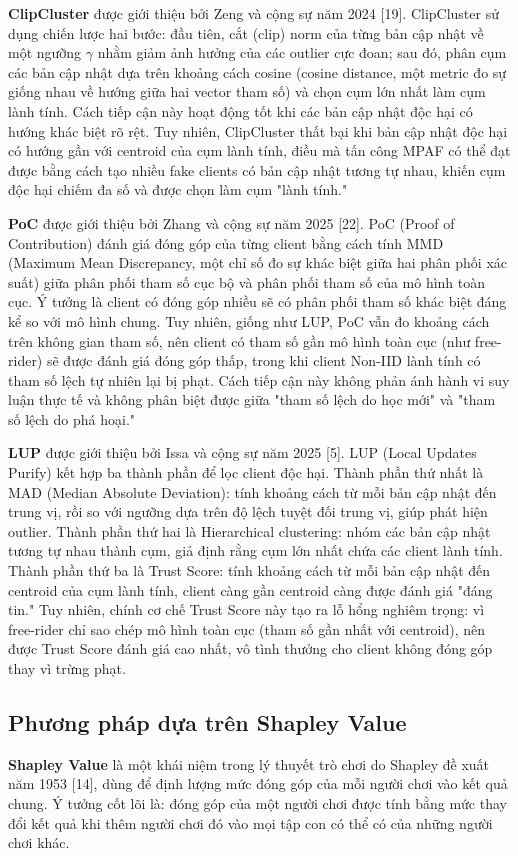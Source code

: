 \textbf{ClipCluster} được giới thiệu bởi Zeng và cộng sự năm 2024 {[}19{]}. ClipCluster sử dụng chiến lược hai bước: đầu tiên, cắt (clip) norm của từng bản cập nhật về một ngưỡng $\gamma$ nhằm giảm ảnh hưởng của các outlier cực đoan; sau đó, phân cụm các bản cập nhật dựa trên khoảng cách cosine (cosine distance, một metric đo sự giống nhau về hướng giữa hai vector tham số) và chọn cụm lớn nhất làm cụm lành tính. Cách tiếp cận này hoạt động tốt khi các bản cập nhật độc hại có hướng khác biệt rõ rệt. Tuy nhiên, ClipCluster thất bại khi bản cập nhật độc hại có hướng gần với centroid của cụm lành tính, điều mà tấn công MPAF có thể đạt được bằng cách tạo nhiều fake clients có bản cập nhật tương tự nhau, khiến cụm độc hại chiếm đa số và được chọn làm cụm "lành tính."

\textbf{PoC} được giới thiệu bởi Zhang và cộng sự năm 2025 {[}22{]}. PoC (Proof of Contribution) đánh giá đóng góp của từng client bằng cách tính MMD (Maximum Mean Discrepancy, một chỉ số đo sự khác biệt giữa hai phân phối xác suất) giữa phân phối tham số cục bộ và phân phối tham số của mô hình toàn cục. Ý tưởng là client có đóng góp nhiều sẽ có phân phối tham số khác biệt đáng kể so với mô hình chung. Tuy nhiên, giống như LUP, PoC vẫn đo khoảng cách trên không gian tham số, nên client có tham số gần mô hình toàn cục (như free-rider) sẽ được đánh giá đóng góp thấp, trong khi client Non-IID lành tính có tham số lệch tự nhiên lại bị phạt. Cách tiếp cận này không phản ánh hành vi suy luận thực tế và không phân biệt được giữa "tham số lệch do học mới" và "tham số lệch do phá hoại."

\textbf{LUP} được giới thiệu bởi Issa và cộng sự năm 2025 {[}5{]}. LUP (Local Updates Purify) kết hợp ba thành phần để lọc client độc hại. Thành phần thứ nhất là MAD (Median Absolute Deviation): tính khoảng cách từ mỗi bản cập nhật đến trung vị, rồi so với ngưỡng dựa trên độ lệch tuyệt đối trung vị, giúp phát hiện outlier. Thành phần thứ hai là Hierarchical clustering: nhóm các bản cập nhật tương tự nhau thành cụm, giả định rằng cụm lớn nhất chứa các client lành tính. Thành phần thứ ba là Trust Score: tính khoảng cách từ mỗi bản cập nhật đến centroid của cụm lành tính, client càng gần centroid càng được đánh giá "đáng tin." Tuy nhiên, chính cơ chế Trust Score này tạo ra lỗ hổng nghiêm trọng: vì free-rider chỉ sao chép mô hình toàn cục (tham số gần nhất với centroid), nên được Trust Score đánh giá cao nhất, vô tình thưởng cho client không đóng góp thay vì trừng phạt.

\subsection{Phương pháp dựa trên Shapley Value}
\textbf{Shapley Value} là một khái niệm trong lý thuyết trò chơi do Shapley đề xuất năm 1953 {[}14{]}, dùng để định lượng mức đóng góp của mỗi người chơi vào kết quả chung. Ý tưởng cốt lõi là: đóng góp của một người chơi được tính bằng mức thay đổi kết quả khi thêm người chơi đó vào mọi tập con có thể có của những người chơi khác.

